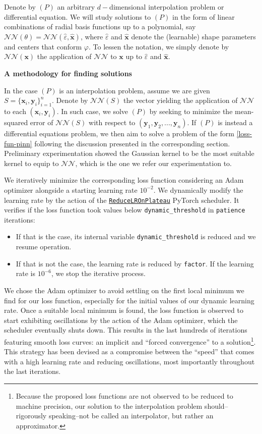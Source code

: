 \documentclass[12pt]{report} %
\newcommand{\tmmathbf}[1]{\ensuremath{\boldsymbol{#1}}}
\begin{document}
Denote by $(P)$  an arbitrary $d-$dimensional interpolation problem or differential equation. We will study solutions to $(P)$ in the form of linear combinations of radial basis functions up to a polynomial, say $\mathcal{NN}(\theta) = \mathcal{NN}(\hat{\varepsilon}, \hat{\tmmathbf{x}})$, where $\hat{\varepsilon}$ and $\hat{\tmmathbf{x}}$ denote the (learnable) shape parameters and centers that conform $\varphi$. To lessen the notation, we simply denote by $\mathcal{NN}(\tmmathbf{x})$ the application of $\mathcal{NN}$ to $\tmmathbf{x}$ up to $\hat{\varepsilon}$ and $\hat{\tmmathbf{x}}$.

\textbf{A methodology for finding solutions}

In the case $(P)$ is an interpolation problem, assume we are given $S = \{\tmmathbf{x}_i, \tmmathbf{y}_i\}_{i=1}^n$. Denote by $\mathcal{NN}(S)$ the vector yielding the application of $\mathcal{NN}$ to each $(\tmmathbf{x}_i, \tmmathbf{y}_i)$. In such case, we solve $(P)$ by seeking to minimize the mean-squared error of $\mathcal{NN}(S)$ with respect to $(\tmmathbf{y}_1, \tmmathbf{y}_2, ..., \tmmathbf{y}_n)$. If $(P)$ is instead a differential equations problem, we then aim to solve a problem of the form \eqref{loss-fun-pinn} following the discussion presented in the corresponding section. Preliminary experimentation showed the Gaussian kernel to be the most suitable kernel to equip to $\mathcal{NN}$, which is the one we refer our experimentation to.

We iteratively minimize the corresponding loss function considering an Adam optimizer alongside a starting learning rate $10^{-2}$. We dynamically modify the learning rate by the action of the \href{https://pytorch.org/docs/stable/generated/torch.optim.lr_scheduler.ReduceLROnPlateau.html}{\texttt{ReduceLROnPlateau}} PyTorch scheduler. It verifies if the loss function took values below \texttt{dynamic\_threshold} in \texttt{patience} iterations:
\begin{itemize}
  \item If that is the case, its internal variable \texttt{dynamic\_threshold} is reduced and we resume operation.
  \item If that is not the case, the learning rate is reduced by \texttt{factor}. If the learning rate is $10^{-6}$, we stop the iterative process.
\end{itemize}

We chose the Adam optimizer to avoid settling on the first local minimum we find for our loss function, especially for the initial values of our dynamic learning rate. Once a suitable local minimum is found, the loss function is observed to start exhibiting oscillations by the action of the Adam optimizer, which the scheduler eventually shuts down. This results in the last hundreds of iterations featuring smooth loss curves: an implicit and ``forced convergence'' to a solution\footnote{Because the proposed loss functions are not observed to be reduced to machine precision, our solution to the interpolation problem should--rigorously speaking--not be called an interpolator, but rather an approximator.}. This strategy has been devised as a compromise between the ``speed'' that comes with a high learning rate and reducing oscillations, most importantly throughout the last iterations.
\end{document}
